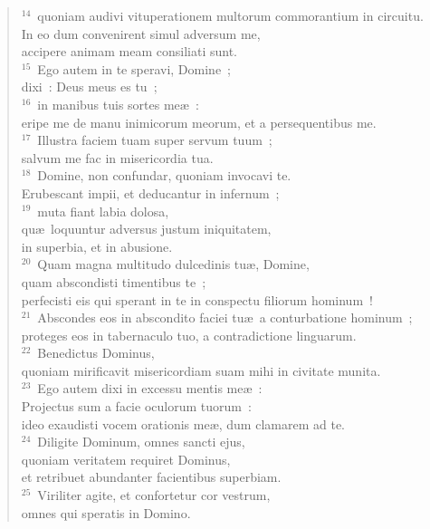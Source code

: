\begin{verse}
${}^{14}$~quoniam audivi vituperationem multorum commorantium in circuitu.\\ In eo dum convenirent simul adversum me,\\ accipere animam meam consiliati sunt.\\
${}^{15}$~Ego autem in te speravi, Domine~;\\ dixi~: Deus meus es tu~;\\
${}^{16}$~in manibus tuis sortes me\ae~:\\ eripe me de manu inimicorum meorum, et a persequentibus me.\\
${}^{17}$~Illustra faciem tuam super servum tuum~;\\ salvum me fac in misericordia tua.\\
${}^{18}$~Domine, non confundar, quoniam invocavi te.\\ Erubescant impii, et deducantur in infernum~;\\
${}^{19}$~muta fiant labia dolosa,\\ qu\ae\ loquuntur adversus justum iniquitatem,\\ in superbia, et in abusione.\\
${}^{20}$~Quam magna multitudo dulcedinis tu\ae , Domine,\\ quam abscondisti timentibus te~;\\ perfecisti eis qui sperant in te in conspectu filiorum hominum~!\\
${}^{21}$~Abscondes eos in abscondito faciei tu\ae\ a conturbatione hominum~;\\ proteges eos in tabernaculo tuo, a contradictione linguarum.\\
${}^{22}$~Benedictus Dominus,\\ quoniam mirificavit misericordiam suam mihi in civitate munita.\\
${}^{23}$~Ego autem dixi in excessu mentis me\ae~:\\ Projectus sum a facie oculorum tuorum~:\\ ideo exaudisti vocem orationis me\ae , dum clamarem ad te.\\
${}^{24}$~Diligite Dominum, omnes sancti ejus,\\ quoniam veritatem requiret Dominus,\\ et retribuet abundanter facientibus superbiam.\\
${}^{25}$~Viriliter agite, et confortetur cor vestrum,\\ omnes qui speratis in Domino.\end{verse}



